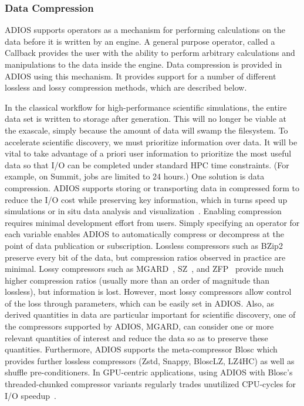 \documentclass[x11names,table,xcdraw,graybox]{svmult}
\begin{document}
\subsubsection{Data Compression}
ADIOS supports operators as a mechanism for performing calculations on the data before it is written by an engine.
A general purpose operator, called a Callback provides the user with the ability to perform arbitrary calculations and manipulations to the data inside the engine. Data compression is provided in ADIOS using this mechanism. It provides support for a number of different lossless and lossy compression methods, which are described below.

In the classical workflow for high-performance scientific simulations, the entire data set is written to storage after generation.
This will no longer be viable at the exascale, simply because the amount of data will swamp the filesystem.
To accelerate scientific discovery, we must prioritize information over data.
It will be vital to take advantage of a priori user information to prioritize the most useful data so that I/O can be completed under standard HPC time constraints.
(For example, on Summit, jobs are limited to 24 hours.)
One solution is data compression.
ADIOS supports storing or transporting data in compressed form to reduce the I/O cost while preserving key information, which in turns speed up simulations or in situ data analysis and visualization~\cite{chenunderstanding}.
Enabling compression requires minimal development effort from users.
Simply specifying an operator for each variable enables ADIOS to automatically compress or decompress at the point of data publication or subscription.
Lossless compressors such as BZip2~\cite{seward1996bzip2} preserve every bit of the data, but compression ratios observed in practice are minimal.
Lossy compressors such as MGARD~\cite{ ainsworth2018multilevel,ainsworth2019multilevel2,ainsworth2019multilevel}, SZ~\cite{di2016fast, liang2018efficient,tao2017significantly}, and ZFP~\cite{lindstrom2014fixed} provide much higher compression ratios (usually more than an order of magnitude than lossless), but information is lost.
However, most lossy compressors allow control of the loss through parameters, which can be easily set in ADIOS.
Also, as derived quantities in data are particular important for scientific discovery, one of the compressors supported by ADIOS, MGARD, can consider one or more relevant quantities of interest and reduce the data so as to preserve these quantities.
Furthermore, ADIOS supports the meta-compressor Blosc which provides further lossless compressors (Zstd, Snappy, BloscLZ, LZ4HC) as well as shuffle pre-conditioners.
In GPU-centric applications, using ADIOS with Blosc's threaded-chunked compressor variants regularly trades unutilized CPU-cycles for I/O speedup~\cite{Huebl2017}.
\end{document}

